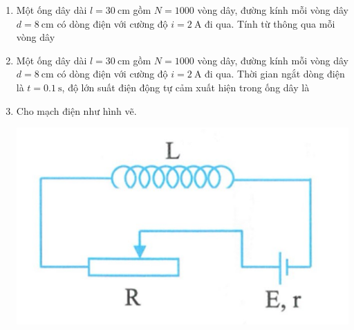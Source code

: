 \begin{enumerate}
{
	}
			\item
	{
		Một ống dây dài $l=\SI{30}{\centi \meter}$ gồm $N=1000$ vòng dây, đường kính mỗi vòng dây $d=\SI{8}{\centi \meter}$ có dòng điện với cường độ $i=\SI{2}{\ampere}$ đi qua. Tính từ thông qua mỗi vòng dây
	}
			\item
	{
		Một ống dây dài $l=\SI{30}{\centi \meter}$ gồm $N=1000$ vòng dây, đường kính mỗi vòng dây $d=\SI{8}{\centi \meter}$ có dòng điện với cường độ $i=\SI{2}{\ampere}$ đi qua. Thời gian ngắt dòng điện là $t=\SI{0.1}{\second}$, độ lớn suất điện động tự cảm xuất hiện trong ống dây là
	}
			\item
	{
		Cho mạch điện như hình vẽ.
		\begin{center}
			\includegraphics[scale=0.35]{../figs/VN11-PH-31-P-0211-1.jpg}

\end{center}}
\end{enumerate}
